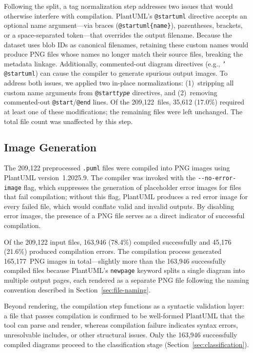 \documentclass[data,datadescriptor,submit,pdftex,moreauthors]{Definitions/mdpi}
\begin{document}
Following the split, a tag normalization step addresses two issues that would otherwise interfere with compilation. PlantUML's \texttt{@startuml} directive accepts an optional name argument---via braces (\texttt{@startuml\{name\}}), parentheses, brackets, or a space-separated token---that overrides the output filename. Because the dataset uses blob IDs as canonical filenames, retaining these custom names would produce PNG files whose names no longer match their source files, breaking the metadata linkage. Additionally, commented-out diagram directives (e.g., \texttt{'\,@startuml}) can cause the compiler to generate spurious output images. To address both issues, we applied two in-place normalizations: (1)~stripping all custom name arguments from \texttt{@start\textit{type}} directives, and (2)~removing commented-out \texttt{@start}/\texttt{@end} lines. Of the 209,122~files, 35,612 (17.0\%) required at least one of these modifications; the remaining files were left unchanged. The total file count was unaffected by this step.

\subsection{Image Generation}
\label{sec:image-generation}

The 209,122 preprocessed \texttt{.puml} files were compiled into PNG images using PlantUML version~1.2025.9. The compiler was invoked with the \texttt{-{}-no-error-image} flag, which suppresses the generation of placeholder error images for files that fail compilation; without this flag, PlantUML produces a red error image for every failed file, which would conflate valid and invalid outputs. By disabling error images, the presence of a PNG file serves as a direct indicator of successful compilation.

Of the 209,122 input files, 163,946 (78.4\%) compiled successfully and 45,176 (21.6\%) produced compilation errors. The compilation process generated 165,177~PNG images in total---slightly more than the 163,946 successfully compiled files because PlantUML's \texttt{newpage} keyword splits a single diagram into multiple output pages, each rendered as a separate PNG file following the naming convention described in Section~\ref{sec:file-naming}.

Beyond rendering, the compilation step functions as a syntactic validation layer: a file that passes compilation is confirmed to be well-formed PlantUML that the tool can parse and render, whereas compilation failure indicates syntax errors, unresolvable includes, or other structural issues. Only the 163,946 successfully compiled diagrams proceed to the classification stage (Section~\ref{sec:classification}).
\end{document}
